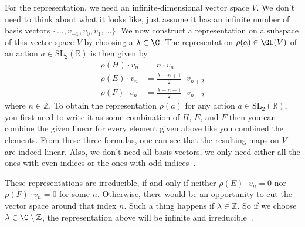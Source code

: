 For the representation, we need an infinite-dimensional vector space $V$.
We don't need to think about what it looks like, just assume it has an infinite number of basis vectors $\{\ldots, v_{-1}, v_0, v_1, \ldots\}$.
We now construct a representation on a subspace of this vector space $V$ by choosing a $\lambda \in \C$.
The representation $\rho(a) \in \GL(V)$ of an action $a \in \text{SL}_2(\mathbb{R})$ is then given by
\begin{subequations}
    \begin{align}
        \rho(H) \cdot v_n & = n \cdot v_n \\
        \rho(E) \cdot v_n & = \frac{\lambda + n + 1}{2} \cdot v_{n + 2} \\
        \rho(F) \cdot v_n & = \frac{\lambda - n - 1}{2} \cdot v_{n - 2}
    \end{align}
\end{subequations}
where $n \in \mathbb{Z}$.
To obtain the representation $\rho(a)$ for any action $a \in \text{SL}_2(\mathbb{R})$, you first need to write it as some combination of $H$, $E$, and $F$ then you can combine the given linear for every element given above like you combined the elements.
From these three formulas, one can see that the resulting maps on $V$ are indeed linear.
Also, we don't need all basis vectors, we only need either all the ones with even indices or the ones with odd indices~\cite{borcherds2011}.

These representations are irreducible, if and only if neither $\rho(E) \cdot v_n = 0$ nor $\rho(F) \cdot v_n = 0$ for some $n$.
Otherwise, there would be an opportunity to cut the vector space around that index $n$.
Such a thing happens if $\lambda \in \mathbb{Z}$.
So if we choose $\lambda \in \C \setminus \mathbb{Z}$, the representation above will be infinite and irreducible~\cite{borcherds2011}.
